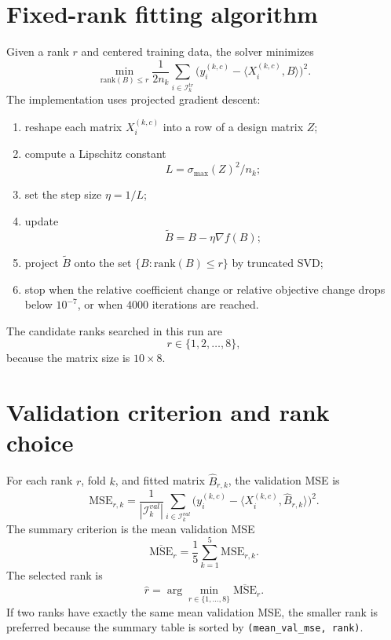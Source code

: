 \documentclass[11pt]{article}
\begin{document}
\section{Fixed-rank fitting algorithm}
Given a rank \(r\) and centered training data, the solver minimizes
\[
\min_{\mathrm{rank}(B)\le r}\frac{1}{2n_k}\sum_{i\in\mathcal I_k^{tr}}
\bigl(y_i^{(k,c)}-\langle X_i^{(k,c)},B\rangle\bigr)^2.
\]
The implementation uses projected gradient descent:
\begin{enumerate}[leftmargin=2em]
    \item reshape each matrix \(X_i^{(k,c)}\) into a row of a design matrix \(Z\);
    \item compute a Lipschitz constant
    \[
    L=\sigma_{\max}(Z)^2/n_k;
    \]
    \item set the step size \(\eta=1/L\);
    \item update
    \[
    \widetilde B=B-\eta \nabla f(B);
    \]
    \item project \(\widetilde B\) onto the set \(\{B:\mathrm{rank}(B)\le r\}\) by truncated SVD;
    \item stop when the relative coefficient change or relative objective change drops below \(10^{-7}\), or when
    \(4000\) iterations are reached.
\end{enumerate}
The candidate ranks searched in this run are
\[
r\in\{1,2,\ldots,8\},
\]
because the matrix size is \(10\times 8\).

\section{Validation criterion and rank choice}
For each rank \(r\), fold \(k\), and fitted matrix \(\widehat B_{r,k}\), the validation MSE is
\[
\mathrm{MSE}_{r,k}
=
\frac{1}{|\mathcal I_k^{val}|}
\sum_{i\in\mathcal I_k^{val}}
\bigl(y_i^{(k,c)}-\langle X_i^{(k,c)},\widehat B_{r,k}\rangle\bigr)^2.
\]
The summary criterion is the mean validation MSE
\[
\overline{\mathrm{MSE}}_r=\frac{1}{5}\sum_{k=1}^5 \mathrm{MSE}_{r,k}.
\]
The selected rank is
\[
\widehat r=\arg\min_{r\in\{1,\ldots,8\}}\overline{\mathrm{MSE}}_r.
\]
If two ranks have exactly the same mean validation MSE, the smaller rank is preferred because the summary table is sorted by
\texttt{(mean\_val\_mse, rank)}.
\end{document}
